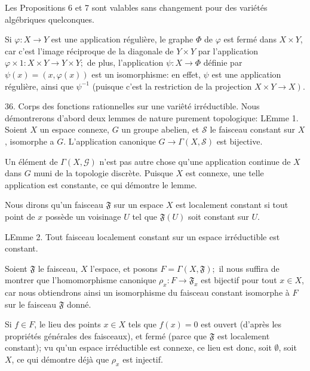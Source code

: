Les Propositions 6 et 7 sont valables sans changement pour des variétés algébriques quelconques.

Si $\varphi: X \rightarrow Y$ est une application régulière, le graphe $\Phi$ de $\varphi$ est fermé dans $X \times Y$, car c'est l'image réciproque de la diagonale de $Y \times Y$ par l'application $\varphi \times 1: X \times Y \rightarrow Y \times Y ;$ de plus, l'application $\psi: X \rightarrow \Phi$ définie par $\psi(x)=(x, \varphi(x))$ est un isomorphisme: en effet, $\psi$ est une application régulière, ainsi que $\psi^{-1}$ (puisque c'est la restriction de la projection $\left.X \times Y \rightarrow X\right)$.

36. Corps des fonctions rationnelles sur une variêté irréductible. Nous démontrerons d'abord deux lemmes de nature purement topologique: LEmme 1. Soient $X$ un espace connexe, $G$ un groupe abelien, et $\mathcal{S}$ le faisceau constant sur $X$, isomorphe a $G .$ L'application canonique $G \rightarrow \Gamma(X, \mathcal{S})$ est bijective.

Un élément de $\Gamma(X, \mathcal{G})$ n'est pas autre chose qu'une application continue de $X$ dans $G$ muni de la topologie discrète. Puisque $X$ est connexe, une telle application est constante, ce qui démontre le lemme.

Nous dirons qu'un faisceau $\mathfrak{F}$ sur un espace $X$ est localement constant si tout point de $x$ possède un voisinage $U$ tel que $\mathfrak{F}(U)$ soit constant sur $U$.

LEmme 2. Tout faisceau localement constant sur un espace irréductible est constant.

Soient $\mathfrak{F}$ le faisceau, $X$ l'espace, et posons $F=\Gamma(X, \mathfrak{F}) ;$ il nous suffira de montrer que l'homomorphisme canonique $\rho_{x}: F \rightarrow \mathfrak{F}_{x}$ est bijectif pour tout $x \in X$, car nous obtiendrons ainsi un isomorphisme du faisceau constant isomorphe à $F$ sur le faisceau $\mathfrak{F}$ donné.

Si $f \in F$, le lieu des points $x \in X$ tels que $f(x)=0$ est ouvert (d'après les propriétés générales des faisceaux), et fermé (parce que $\mathfrak{F}$ est localement constant); vu qu'un espace irréductible est connexe, ce lieu est donc, soit $\emptyset$, soit $X$, ce qui démontre déjà que $\rho_{x}$ est injectif.

